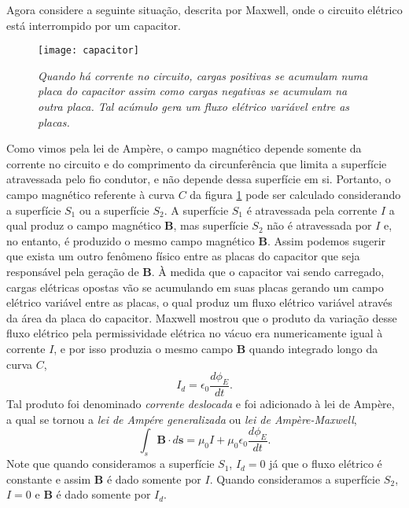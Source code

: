 Agora considere a seguinte situação, descrita por Maxwell, onde o circuito elétrico está interrompido por um capacitor. 
\begin{figure}
\centering
\texttt{[image: capacitor]}
\caption{\textit{Quando há corrente no circuito, cargas positivas se acumulam numa placa do capacitor assim como cargas negativas se acumulam na outra placa. Tal acúmulo gera um fluxo elétrico variável entre as placas.}}
\label{fig.capacitor}
\end{figure}
Como vimos pela lei de Ampère, o campo magnético depende somente da corrente no circuito e do comprimento da circunferência que limita a superfície atravessada pelo fio condutor, e não depende dessa superfície em si. Portanto, o campo magnético referente à curva $C$ da figura \ref{fig.capacitor} pode ser calculado considerando a superfície $S_1$ ou a superfície $S_2$. A superfície $S_1$ é atravessada pela corrente $I$ a qual produz o campo magnético $\mathbf{B}$, mas superfície $S_2$ não é atravessada por $I$ e, no entanto, é produzido o mesmo campo magnético $\mathbf{B}$. Assim podemos sugerir que exista um outro fenômeno físico entre as placas do capacitor que seja responsável pela geração de $\mathbf{B}$. À medida que o capacitor vai sendo carregado, cargas elétricas opostas vão se acumulando em suas placas gerando um campo elétrico variável entre as placas, o qual produz um fluxo elétrico variável através da área da placa do capacitor. Maxwell mostrou que o produto da variação desse fluxo elétrico pela permissividade elétrica no vácuo era numericamente igual à corrente $I$, e por isso produzia o mesmo campo $\mathbf{B}$ quando integrado longo da curva $C$,
\begin{equation*}
I_d=\epsilon_0\frac{d\phi_E}{dt}.
\end{equation*}
Tal produto foi denominado \textit{corrente deslocada} e foi adicionado à lei de Ampère, a qual se tornou a \textit{lei de Ampére generalizada} ou \textit{lei de Ampère-Maxwell},
\begin{equation}\label{eq.ampere_generalizada}
\int_s\mathbf{B}\cdot d\mathbf{s}=\mu_0I+\mu_0\epsilon_0\frac{d\phi_E}{dt}.
\end{equation}
Note que quando consideramos a superfície $S_1$, $I_d=0$ já que o fluxo elétrico é constante e assim $\mathbf{B}$ é dado somente por $I$. Quando consideramos a superfície $S_2$, $I=0$ e $\mathbf{B}$ é dado somente por $I_d$. 




